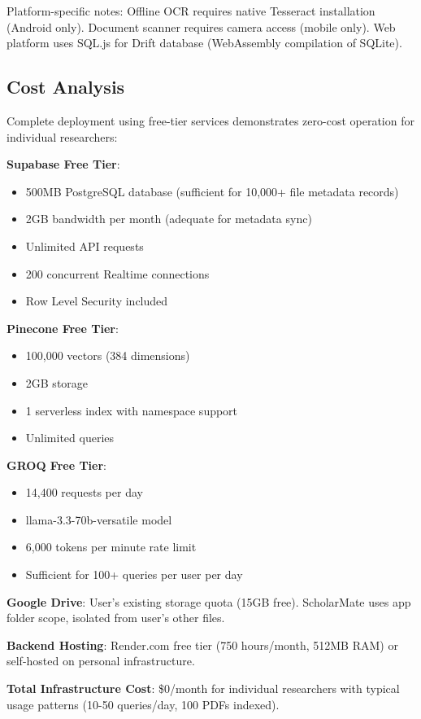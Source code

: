 \documentclass[conference]{IEEEtran}
\begin{document}
Platform-specific notes: Offline OCR requires native Tesseract installation (Android only). Document scanner requires camera access (mobile only). Web platform uses SQL.js for Drift database (WebAssembly compilation of SQLite).

\subsection{Cost Analysis}

Complete deployment using free-tier services demonstrates zero-cost operation for individual researchers:

\textbf{Supabase Free Tier}:
\begin{itemize}
\item 500MB PostgreSQL database (sufficient for 10,000+ file metadata records)
\item 2GB bandwidth per month (adequate for metadata sync)
\item Unlimited API requests
\item 200 concurrent Realtime connections
\item Row Level Security included
\end{itemize}

\textbf{Pinecone Free Tier}:
\begin{itemize}
\item 100,000 vectors (384 dimensions)
\item 2GB storage
\item 1 serverless index with namespace support
\item Unlimited queries
\end{itemize}

\textbf{GROQ Free Tier}:
\begin{itemize}
\item 14,400 requests per day
\item llama-3.3-70b-versatile model
\item 6,000 tokens per minute rate limit
\item Sufficient for 100+ queries per user per day
\end{itemize}

\textbf{Google Drive}: User's existing storage quota (15GB free). ScholarMate uses app folder scope, isolated from user's other files.

\textbf{Backend Hosting}: Render.com free tier (750 hours/month, 512MB RAM) or self-hosted on personal infrastructure.

\textbf{Total Infrastructure Cost}: \$0/month for individual researchers with typical usage patterns (10-50 queries/day, 100 PDFs indexed).
\end{document}
